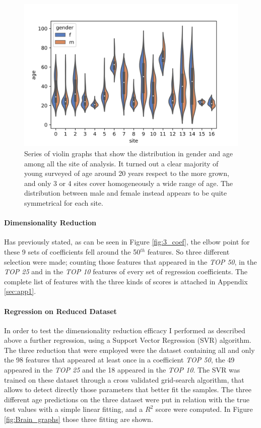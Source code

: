 \documentclass{article}
\begin{document}
\begin{figure}[ht]
	\includegraphics[width=\textwidth]{violin_gender_site}
	\caption{Series of violin graphs that show the distribution in gender and age among all the site of analysis. It turned out a clear majority of young surveyed of age around 20 years respect to the more grown, and only 3 or 4 sites cover homogeneously a wide range of age. The distribution between male and female instead appears to be quite symmetrical for each site.  }
	\label{fig:gend_distr}
	\centering
\end{figure}

\paragraph{Dimensionality Reduction}
Has previously stated, as can be seen in Figure \ref{fig:3_coef}, the elbow point for these 9 sets of coefficients fell around the 50$^{th}$ features. So three different selection were made; counting those features that appeared in the \emph{TOP 50}, in the \emph{TOP 25} and in the \emph{TOP 10} features of every set of regression coefficients. The complete list of features with the three kinds of scores is attached in Appendix \ref{sec:app1}.

\paragraph{Regression on Reduced Dataset}
In order to test the dimensionality reduction efficacy I performed as described above a further regression, using a Support Vector Regression (SVR) algorithm. The three reduction that were employed were the dataset containing all and only the 98 features that appeared at least once in a coefficient \emph{TOP 50}, the 49 appeared in the \emph{TOP 25} and the 18 appeared in the \emph{TOP 10}.
The SVR was trained on these dataset through a cross validated grid-search algorithm, that allows to detect directly those parameters that better fit the samples. The three different age predictions on the three dataset were put in relation with the true test values with a simple linear fitting, and a $R^2$ score were computed. In Figure \ref{fig:Brain_graphs} those three fitting are shown.
\end{document}
